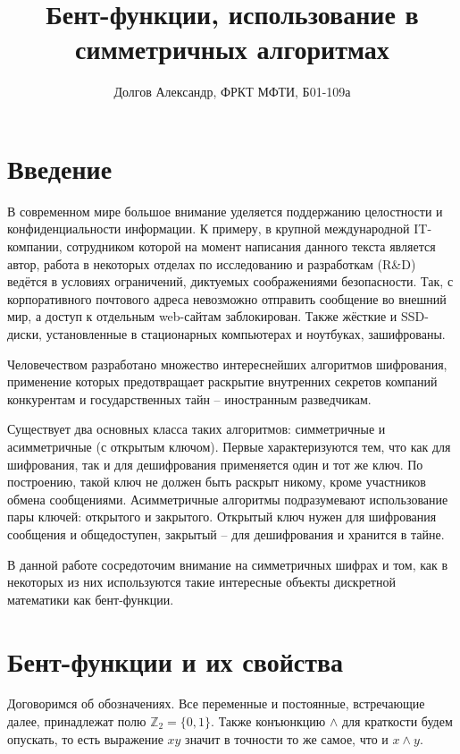 \documentclass[12pt, a4paper, reqno]{article}
\title{\bf Бент-функции, использование в симметричных алгоритмах}
\date{}
\author{Долгов Александр, ФРКТ МФТИ, Б01-109а}
\begin{document}
\nocite{*}

\maketitle

\newpage
\tableofcontents

\newpage
\section{Введение}

    В современном мире большое внимание уделяется поддержанию целостности и конфиденциальности
    информации. К примеру, в крупной международной IT-компании, сотрудником которой на момент
    написания данного текста является автор, работа в некоторых отделах по исследованию и
    разработкам (R\&D) ведётся в условиях ограничений, диктуемых соображениями безопасности. Так,
    с корпоративного почтового адреса невозможно отправить сообщение во внешний мир, а доступ к
    отдельным web-сайтам заблокирован. Также жёсткие и SSD-диски, установленные в стационарных
    компьютерах и ноутбуках, зашифрованы.

    Человечеством разработано множество интереснейших алгоритмов шифрования, применение которых
    предотвращает раскрытие внутренних секретов компаний конкурентам и государственных тайн --
    иностранным разведчикам.

    Существует два основных класса таких алгоритмов: симметричные и асимметричные (с открытым
    ключом). Первые характеризуются тем, что как для шифрования, так и для дешифрования применяется
    один и тот же ключ. По построению, такой ключ не должен быть раскрыт никому, кроме участников
    обмена сообщениями. Асимметричные алгоритмы подразумевают использование пары ключей: открытого и
    закрытого. Открытый ключ нужен для шифрования сообщения и общедоступен, закрытый -- для
    дешифрования и хранится в тайне.

    В данной работе сосредоточим внимание на симметричных шифрах и том, как в некоторых из них
    используются такие интересные объекты дискретной математики как бент-функции.

\section{Бент-функции и их свойства}

    Договоримся об обозначениях. Все переменные и постоянные, встречающие далее, принадлежат полю
    $\mathbb{Z}_2 = \{0, 1\}$. Также конъюнкцию $\wedge$ для краткости будем опускать, то есть
    выражение $xy$ значит в точности то же самое, что и $x \wedge y$.
\end{document}
